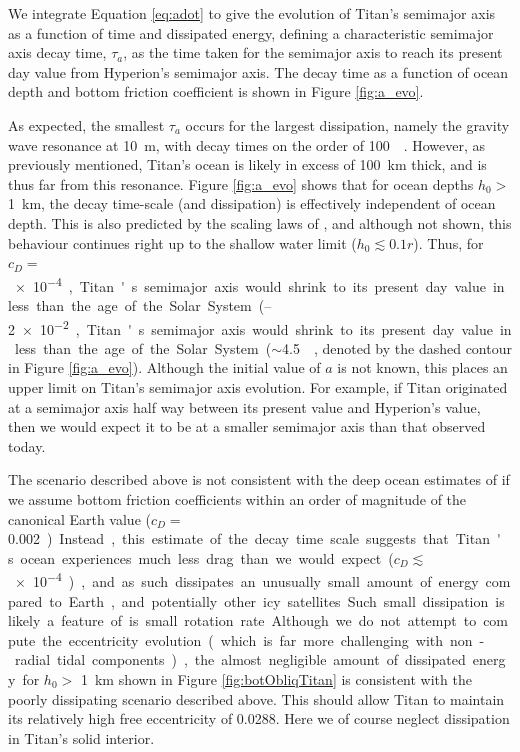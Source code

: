 We integrate Equation \ref{eq:adot} to give the evolution of Titan's semimajor axis as a function of time and dissipated energy, defining a characteristic semimajor axis decay time, $\tau_{a}$, as the time taken for the semimajor axis to reach its present day value from Hyperion's semimajor axis. The decay time as a function of ocean depth and bottom friction coefficient is shown in Figure \ref{fig:a_evo}.



  
As expected, the smallest $\tau_a$ occurs for the largest dissipation, namely the gravity wave resonance at \SI{10}{\metre}, with decay times on the order of \SI{100}{\mega\year}. However, as previously mentioned, Titan's ocean is likely in excess of \SI{100}{\kilo\metre} thick, and is thus far from this resonance. Figure \ref{fig:a_evo} shows that for ocean depths $h_0 >$ \SI{1}{\kilo\metre}, the decay time-scale (and dissipation) is effectively independent of ocean depth. This is also predicted by the scaling laws of \citet{chen2013tidal}, and although not shown, this behaviour continues right up to the shallow water limit ($h_0 \lesssim 0.1r$). Thus, for $c_D =$ \SIrange{e-4}{2e-2}, Titan's semimajor axis would shrink to its present day value in less than the age of the Solar System ($\sim$\SI{4.5}{\giga\year}, denoted by the dashed contour in Figure \ref{fig:a_evo}). Although the initial value of $a$ is not known, this places an upper limit on Titan's semimajor axis evolution. For example, if Titan originated at a semimajor axis half way between its present value and Hyperion's value, then we would expect it to be at a smaller semimajor axis than that observed today.

The scenario described above is not consistent with the deep ocean estimates of \citep{sohl2003interior} if we assume bottom friction coefficients within an order of magnitude of the canonical Earth value ($c_D =$ \SI{0.002}). Instead, this estimate of the decay time scale suggests that Titan's ocean experiences much less drag than we would expect ($c_D \lesssim$ \SI{e-4}), and as such dissipates an unusually small amount of energy compared to Earth, and potentially other icy satellites. Such small dissipation is likely a feature of is small rotation rate.

Although we do not attempt to compute the eccentricity evolution (which is far more challenging with non-radial tidal components), the almost negligible amount of dissipated energy for $h_0 >$ \SI{1}{\kilo\metre} shown in Figure \ref{fig:botObliqTitan} is consistent with the poorly dissipating scenario described above. This should allow Titan to maintain its relatively high free eccentricity of 0.0288. Here we of course neglect dissipation in Titan's solid interior.

